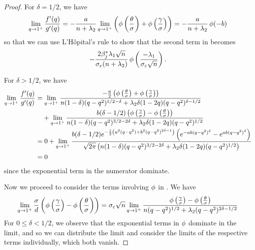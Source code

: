 \begin{proof}
  For \(\delta = 1/2\), we have
  \[
    \lim_{q \rightarrow 1^+} \frac{f'(q)}{g'(q)} = -\frac{a}{n + \lambda_2} \lim_{q \rightarrow 1^+}\left(\operatorname{\phi}\left(\frac{\theta}{\sigma}\right) + \operatorname{\phi}\left(\frac{\gamma}{\sigma}\right)\right) = -\frac{a}{n + \lambda_2} \operatorname{\phi}(-b)
  \]
  so that we can use L'Hôpital's rule to show that the second term in  becomes
  \begin{equation}
    \label{eq:eval-qlimit-stdcase}
    -\frac{2\beta_j^*\lambda_1\sqrt{n}}{\sigma_\varepsilon(n + \lambda_2)} \operatorname{\phi}\left(\frac{-\lambda_1}{\sigma_\varepsilon\sqrt{n}}\right).
  \end{equation}

  For \(\delta > 1/2\), we have
  \[
    \begin{aligned}
      \lim_{q \rightarrow 1^+} \frac{f'(q)}{g'(q)} & = \lim_{q \rightarrow 1^+} \frac{-\frac{a}{2}\left(\pdf\left(\frac{\theta}{\sigma}\right) + \pdf\left(\frac{\gamma}{\sigma}\right)\right)}{n(1-\delta)(q - q^2)^{1/2 - \delta} + \lambda_2 \delta(1 - 2q)(q - q^2)^{\delta - 1/2}}                                                       \\
                                                   & \phantom{= {}} + \lim_{q \rightarrow 1^+} \frac{b(\delta - 1/2)\left(\pdf\left(\frac{\gamma}{\sigma}\right) - \pdf\left(\frac{\theta}{\sigma}\right)\right)}{n(1 - \delta)(q - q^2)^{3/2 - 2\delta} + \lambda_2 \delta (1 - 2q)(q - q^2)^{1/2}}                                          \\
                                                   & = 0 + \lim_{q \rightarrow 1^+} \frac{b(\delta - 1/2) e^{-\frac{1}{2}\left(a^2(q - q^2) + b^2(q - q^2)^{2\delta - 1}\right)}\left(e^{-ab(q-q^2)^\delta} - e^{ab(q-q^2)^\delta}\right)}{\sqrt{2\pi}\left(n(1-\delta)(q - q^2)^{3/2 - 2\delta} + \lambda_2\delta(1-2q)(q-q^2)^{1/2}\right)} \\
                                                   & = 0
    \end{aligned}
  \]
  since the exponential term in the numerator dominate.

  Now we proceed to consider the terms involving \(\operatorname{\phi}\) in . We have
  \begin{equation}
    \label{eq:eval-qlimit-pdfterm}
    \lim_{q \rightarrow 1^+} \frac{\sigma}{d} \left(\operatorname{\phi} \left(\frac{\gamma}{\sigma}\right) - \operatorname{\phi} \left(\frac{\theta}{\sigma}\right)\right)
    = \sigma_\varepsilon \sqrt{n} \lim_{q \rightarrow 1^+} \frac{ \operatorname{\phi}\left(\frac{\gamma}{\sigma}\right) - \operatorname{\phi}\left(\frac{\theta}{\sigma}\right)}{n(q-q^2)^{1/2} + \lambda_2(q - q^2)^{2\delta - 1/2}}
  \end{equation}
  For \(0 \leq \delta < 1/2\), we observe that the exponential terms in \(\operatorname{\phi}\) dominate in the limit, and so we can distribute the limit and consider the limits of the respective terms individually, which both vanish.


\end{proof}
